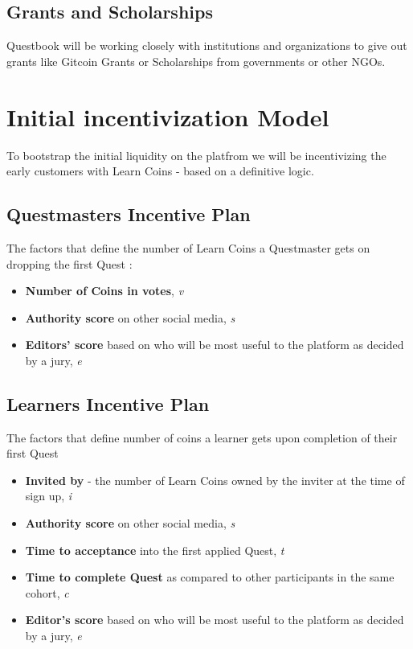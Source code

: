 \documentclass{article}
\begin{document}
    \subsection{Grants and Scholarships}
      Questbook will be working closely with institutions and organizations to give out grants like Gitcoin Grants or Scholarships from governments or other NGOs.
  \section{Initial incentivization Model}
    To bootstrap the initial liquidity on the platfrom we will be incentivizing the early customers with Learn Coins - based on a definitive logic.
    \subsection{Questmasters Incentive Plan}
      The factors that define the number of Learn Coins a Questmaster gets on dropping the first Quest :
      \begin{itemize}
        \item \textbf{Number of Coins in votes}, \textit{v}
        \item \textbf{Authority score} on other social media, \textit{s}
        \item \textbf{Editors' score} based on who will be most useful to the platform as decided by a jury, \textit{e}
      \end{itemize} 
    \subsection{Learners Incentive Plan}
      The factors that define number of coins a learner gets upon completion of their first Quest
      \begin{itemize}
        \item \textbf{Invited by } - the number of Learn Coins owned by the inviter at the time of sign up, \textit{i}
        \item \textbf{Authority score} on other social media, \textit{s}
        \item \textbf{Time to acceptance} into the first applied Quest, \textit{t}
        \item \textbf{Time to complete Quest} as compared to other participants in the same cohort, \textit{c}
        \item \textbf{Editor's score} based on who will be most useful to the platform as decided by a jury, \textit{e}
      \end{itemize}
\end{document}
